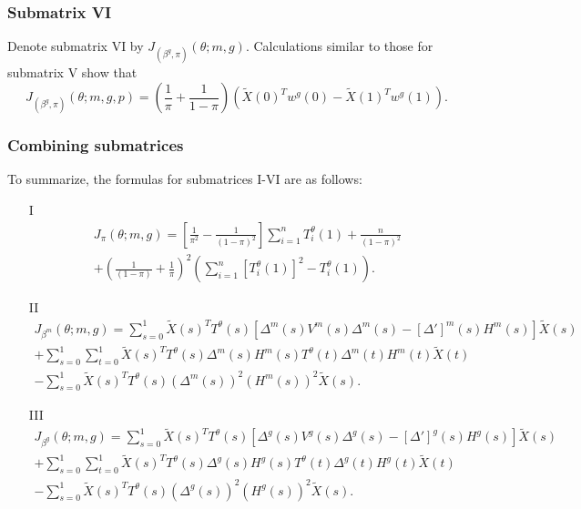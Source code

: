 \documentclass[11pt]{article}
\begin{document}
\begin{appendices}
\begin{refsection}
\subsubsection*{Submatrix VI}
Denote submatrix VI by $J_{(\beta^g,\pi)}(\theta; m, g).$ Calculations similar to those for submatrix V show that
\begin{equation}\label{sub_mat_6_formula} J_{(\beta^g, \pi)}(\theta; m, g, p) = \left(\frac{1}{\pi} + \frac{1}{1 - \pi} \right) \left( \tilde{X}(0)^T w^g(0) - \tilde{X}(1)^T w^g(1)\right). \end{equation}

\subsubsection*{Combining submatrices}
To summarize, the formulas for submatrices I-VI are as follows:
\begin{itemize}
\item[I]\begin{multline*}
J_\pi(\theta; m, g) = 
\left[ \frac{1}{\pi^2} - \frac{1}{(1 - \pi )^2} \right] \sum_{i=1}^n T^\theta_i(1) + \frac{n}{(1-\pi )^2} \\ + \left( \frac{1}{(1 - \pi )} + \frac{1}{\pi} \right)^2 \left( \sum_{i=1}^n [T^\theta_i(1)]^2 - T^\theta_i(1) \right).
\end{multline*}
\item[II] \begin{multline*}
J_{\beta^m}(\theta; m, g) = \sum_{s=0}^1 \tilde{X}(s)^T T^{\theta}(s) \left[ {\Delta}^m(s) {V}^m(s) {\Delta}^m(s) - [{\Delta}']^m(s) {H}^m(s) \right] \tilde{X}(s) \\ + \sum_{s=0}^1 \sum_{t=0}^1 \tilde{X}(s)^T {T}^\theta(s) {\Delta}^m(s) {H}^m(s) {T}^\theta(t) {\Delta}^m(t) {H}^m(t) \tilde{X}(t) \\ - \sum_{s=0}^1 \tilde{X}(s)^T T^{\theta}(s) ({\Delta}^m(s))^2 ({H}^m(s))^2 \tilde{X}(s).
\end{multline*}
\item[III] \begin{multline*}
J_{\beta^g}(\theta; m, g) = \sum_{s=0}^1 \tilde{X}(s)^T T^{\theta}(s) \left[{\Delta}^g(s) {V}^g(s) {\Delta}^g(s) - [{\Delta}']^g(s) {H}^g(s) \right] \tilde{X}(s) \\ + \sum_{s=0}^1 \sum_{t=0}^1 \tilde{X}(s)^T {T}^\theta(s) {\Delta}^g(s) {H}^g(s) {T}^\theta(t) {\Delta}^g(t) {H}^g(t) \tilde{X}(t) \\ - \sum_{s=0}^1 \tilde{X}(s)^T T^{\theta}(s) ({\Delta}^g(s))^2 ({H}^g(s))^2 \tilde{X}(s).

\end{multline*}
\end{itemize}
\end{refsection}
\end{appendices}
\end{document}
